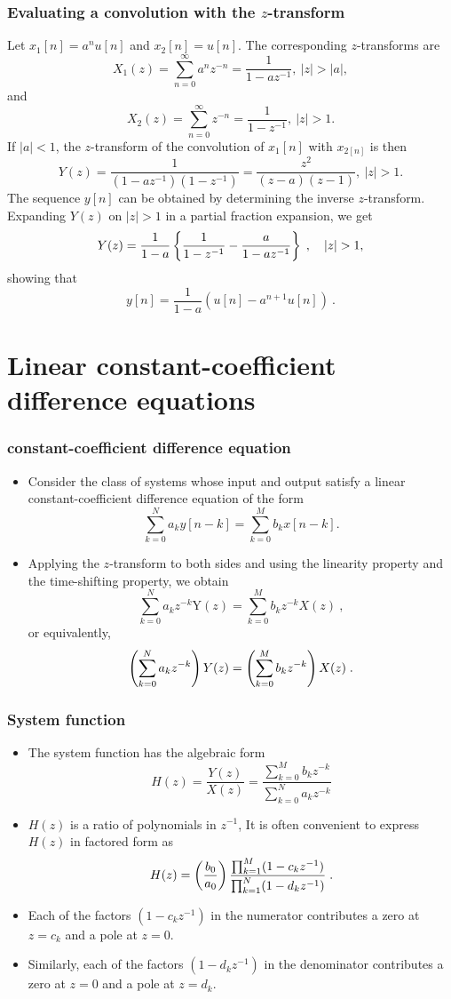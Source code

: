 \begin{frame}
\frametitle{Evaluating a convolution with the $z$-transform}
Let $x_{1}[n]=a^{n}u[n]$ and $x_{2}[n]=u[n]$. The corresponding $z$-transforms are
$$
X_{1}(z)=\sum_{n=0}^{\infty}a^{n}z^{-n}=\frac{1}{1-az^{-1}},\ |z|>|a|,
$$
and
$$
X_{2}(z)=\sum_{n=0}^{\infty}z^{-n}=\frac{1}{1-z^{-1}},\ |z|>1.
$$
If $|a|<1$, the $z$-transform of the convolution of $x_{1}[n]$ with $x_{2[n]}$ is then
$$
Y(z)=\frac{1}{(1-az^{-1})(1-z^{-1})}=\frac{z^{2}}{(z-a)(z-1)},\ |z|>1.
$$
The sequence $y[n]$ can be obtained by determining the inverse $z$-transform. Expanding $Y(z)$ on $|z|> 1$ in a partial fraction expansion, we get
$$
Y(z)=\frac{1}{1-a} \left\{ \frac{1}{1-z^{-1}}-\frac{a}{1-az^{-1}} \right\} \eqsp, \quad |z|>1,
$$
showing that
$$
y[n]=\frac{1}{1-a}(u[n]-a^{n+1}u[n])\ .
$$
\end{frame}


\section{Linear constant-coefficient difference equations}
\begin{frame}
\frametitle{constant-coefficient difference equation}
\begin{itemize}
\item Consider the class of systems whose input and output satisfy a linear constant-coefficient difference equation of the form
\alert{
$$
\sum_{k=0}^{N}a_{k}y[n-k]=\sum_{k=0}^{M}b_{k}x[n-k].
$$
}
\item Applying the $z$-transform to both sides  and using the \alert{linearity property} and the \alert{time-shifting} property, 
we obtain
$$
\sum_{k=0}^{N}a_{k}z^{-k}\mathrm{Y}(z)=\sum_{k=0}^{M}b_{k}z^{-k}X(z)\ ,
$$
or equivalently,
$$
\left(\sum_{k=0}^{N}a_{k}z^{-k} \right) Y(z)= \left(\sum_{k=0}^{M}b_{k}z^{-k} \right) X(z) \;.
$$
\end{itemize}
\end{frame}

\begin{frame}
\frametitle{System function}
\begin{itemize}
\item The system function has the algebraic form
$$
H(z)=\frac{Y(z)}{X(z)}=\frac{\sum_{k=0}^{M}b_{k}z^{-k}}{\sum_{k=0}^{N}a_{k}z^{-k}}
$$
\item $H(z)$  is a ratio of polynomials in $z^{-1}$, It is often convenient to express $H(z)$ in factored form as
$$
H(z)=\left(\frac{b_{0}}{a_{0}} \right)\frac{\prod_{k=1}^M (1-c_{k}z^{-1})}{\prod_{k=1}^{N}(1-d_{k}z^{-1})} \;.
$$
\item Each of the factors $(1-c_{k}z^{-1})$ in the numerator contributes a zero at $z=c_{k}$ and a pole at $z=0$. 
\item Similarly, each of the factors $(1-d_{k}z^{-1})$ in the denominator contributes a zero at $z=0$ and a pole at $z=d_{k}$.
\end{itemize}
\end{frame}

